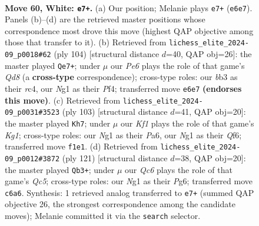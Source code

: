 \documentclass[11pt]{article}
\begin{document}
\clearpage

\begin{figure}[p]\centering
\begin{subfigure}{0.46\textwidth}\centering
\resizebox{\linewidth}{!}{%
\newchessgame
\chessboard[
  setfen={8/8/p1Q1P1k1/3P3p/6p1/Nb6/5P1q/5KN1 w - - 3 60},
  showmover=false,
  pgfstyle=straightmove, color=movearrow, markmove={e6-e7}
]}
\caption{}
\end{subfigure}\hfill
\begin{subfigure}{0.46\textwidth}\centering
\resizebox{\linewidth}{!}{%
\newchessgame
\chessboard[
  setfen={3Q4/pk6/4p1N1/5q2/2r2P2/7P/6PK/8 w - - 4 53},
  showmover=false,
  pgfstyle=straightmove, color=movearrow, markmove={d8-e7}
]}
\caption{}
\end{subfigure}
\\[4pt]
\begin{subfigure}{0.46\textwidth}\centering
\resizebox{\linewidth}{!}{%
\newchessgame
\chessboard[
  setfen={6k1/6p1/pQ3q1p/Pp6/8/6PP/5P2/6K1 b - - 6 52},
  showmover=false,
  pgfstyle=straightmove, color=movearrow, markmove={g8-h7}
]}
\caption{}
\end{subfigure}\hfill
\begin{subfigure}{0.46\textwidth}\centering
\resizebox{\linewidth}{!}{%
\newchessgame
\chessboard[
  setfen={8/5p1k/5Qp1/1p2P3/2q2PP1/4K3/8/8 b - - 30 61},
  showmover=false,
  pgfstyle=straightmove, color=movearrow, markmove={c4-b3}
]}
\caption{}
\end{subfigure}
\caption{\textbf{Move 60, White: \texttt{e7+}.} (a) Our position; Melanie plays \texttt{e7+} (\texttt{e6e7}). Panels (b)--(d) are the retrieved master positions whose correspondence most drove this move (highest QAP objective among those that transfer to it). (b) Retrieved from \texttt{lichess\_elite\_2024-09\_p0018\#62} (ply 104) [structural distance $d$=40, QAP obj=26]: the master played \texttt{Qe7+}; under $\mu$ our \emph{Pe6} plays the role of that game's \emph{Qd8} (a \textbf{cross-type} correspondence); cross-type roles: our \emph{b}b3 as their \emph{r}c4, our \emph{N}g1 as their \emph{P}f4; transferred move \texttt{e6e7} \textbf{(endorses this move)}. (c) Retrieved from \texttt{lichess\_elite\_2024-09\_p0031\#3523} (ply 103) [structural distance $d$=41, QAP obj=20]: the master played \texttt{Kh7}; under $\mu$ our \emph{Kf1} plays the role of that game's \emph{Kg1}; cross-type roles: our \emph{N}g1 as their \emph{P}a6, our \emph{N}g1 as their \emph{Q}f6; transferred move \texttt{f1e1}. (d) Retrieved from \texttt{lichess\_elite\_2024-09\_p0012\#3872} (ply 121) [structural distance $d$=38, QAP obj=20]: the master played \texttt{Qb3+}; under $\mu$ our \emph{Qc6} plays the role of that game's \emph{Qc5}; cross-type roles: our \emph{N}g1 as their \emph{P}g6; transferred move \texttt{c6a6}. Synthesis: 1 retrieved analog transferred to \texttt{e7+} (summed QAP objective 26, the strongest correspondence among the candidate moves); Melanie committed it via the \texttt{search} selector.}
\label{fig:thought-m118}
\end{figure}
\end{document}
